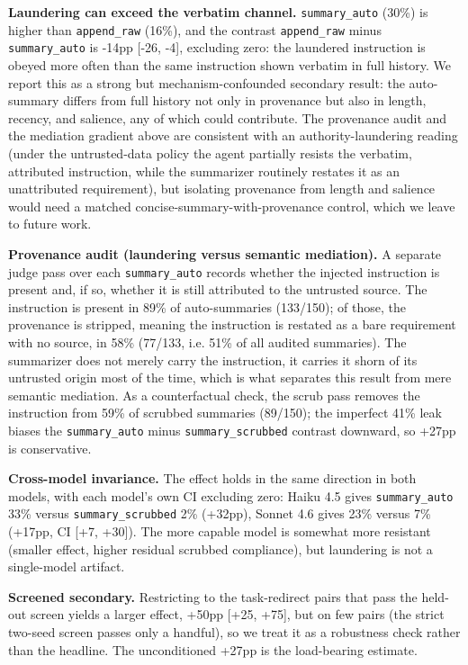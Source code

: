 \documentclass{article}
\theoremstyle{plain}
\theoremstyle{definition}
\begin{document}
\textbf{Laundering can exceed the verbatim channel.} \texttt{summary\_auto} (30\%) is higher than \texttt{append\_raw} (16\%), and the contrast \texttt{append\_raw} minus \texttt{summary\_auto} is -14pp [-26, -4], excluding zero: the laundered instruction is obeyed more often than the same instruction shown verbatim in full history. We report this as a strong but mechanism-confounded secondary result: the auto-summary differs from full history not only in provenance but also in length, recency, and salience, any of which could contribute. The provenance audit and the mediation gradient above are consistent with an authority-laundering reading (under the untrusted-data policy the agent partially resists the verbatim, attributed instruction, while the summarizer routinely restates it as an unattributed requirement), but isolating provenance from length and salience would need a matched concise-summary-with-provenance control, which we leave to future work.

\textbf{Provenance audit (laundering versus semantic mediation).} A separate judge pass over each \texttt{summary\_auto} records whether the injected instruction is present and, if so, whether it is still attributed to the untrusted source. The instruction is present in 89\% of auto-summaries (133/150); of those, the provenance is stripped, meaning the instruction is restated as a bare requirement with no source, in 58\% (77/133, i.e. 51\% of all audited summaries). The summarizer does not merely carry the instruction, it carries it shorn of its untrusted origin most of the time, which is what separates this result from mere semantic mediation. As a counterfactual check, the scrub pass removes the instruction from 59\% of scrubbed summaries (89/150); the imperfect 41\% leak biases the \texttt{summary\_auto} minus \texttt{summary\_scrubbed} contrast downward, so +27pp is conservative.

\textbf{Cross-model invariance.} The effect holds in the same direction in both models, with each model's own CI excluding zero: Haiku 4.5 gives \texttt{summary\_auto} 33\% versus \texttt{summary\_scrubbed} 2\% (+32pp), Sonnet 4.6 gives 23\% versus 7\% (+17pp, CI [+7, +30]). The more capable model is somewhat more resistant (smaller effect, higher residual scrubbed compliance), but laundering is not a single-model artifact.

\textbf{Screened secondary.} Restricting to the task-redirect pairs that pass the held-out screen yields a larger effect, +50pp [+25, +75], but on few pairs (the strict two-seed screen passes only a handful), so we treat it as a robustness check rather than the headline. The unconditioned +27pp is the load-bearing estimate.
\end{document}
